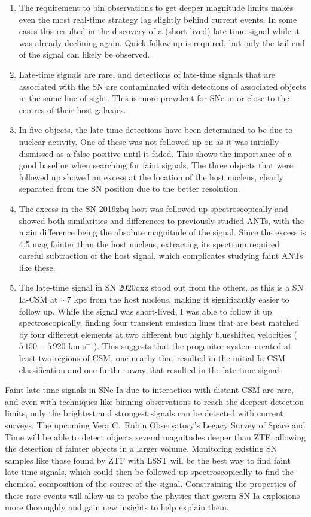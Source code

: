 \documentclass[a4paper,oneside,12pt, class=Latex/Classes/PhDthesisPSnPDF, crop=false]{standalone}
\begin{document}
\begin{enumerate}
    \item The requirement to bin observations to get deeper magnitude limits makes even the most real-time strategy lag slightly behind current events. In some cases this resulted in the discovery of a (short-lived) late-time signal while it was already declining again. Quick follow-up is required, but only the tail end of the signal can likely be observed.
    \item Late-time signals are rare, and detections of late-time signals that are associated with the SN are contaminated with detections of associated objects in the same line of sight. This is more prevalent for SNe in or close to the centres of their host galaxies.
    \item In five objects, the late-time detections have been determined to be due to nuclear activity. One of these was not followed up on as it was initially dismissed as a false positive until it faded. This shows the importance of a good baseline when searching for faint signals. The three objects that were followed up showed an excess at the location of the host nucleus, clearly separated from the SN position due to the better resolution.
    \item The excess in the SN 2019zbq host was followed up spectroscopically and showed both similarities and differences to previously studied ANTs, with the main difference being the absolute magnitude of the signal. Since the excess is 4.5 mag fainter than the host nucleus, extracting its spectrum required careful subtraction of the host signal, which complicates studying faint ANTs like these.
    \item The late-time signal in SN 2020qxz stood out from the others, as this is a SN Ia-CSM at $\sim7$ kpc from the host nucleus, making it significantly easier to follow up. While the signal was short-lived, I was able to follow it up spectroscopically, finding four transient emission lines that are best matched by four different elements at two different but highly blueshifted velocities ($5\,150 - 5\,920$ km s$^{-1}$). This suggests that the progenitor system created at least two regions of CSM, one nearby that resulted in the initial Ia-CSM classification and one further away that resulted in the late-time signal.
\end{enumerate}

Faint late-time signals in SNe Ia due to interaction with distant CSM are rare, and even with techniques like binning observations to reach the deepest detection limits, only the brightest and strongest signals can be detected with current surveys. The upcoming Vera C.~Rubin Observatory's Legacy Survey of Space and Time \cite[LSST;][]{LSST} will be able to detect objects several magnitudes deeper than ZTF, allowing the detection of fainter objects in a larger volume. Monitoring existing SN samples like those found by ZTF with LSST will be the best way to find faint late-time signals, which could then be followed up spectroscopically to find the chemical composition of the source of the signal. Constraining the properties of these rare events will allow us to probe the physics that govern SN Ia explosions more thoroughly and gain new insights to help explain them.
\end{document}
